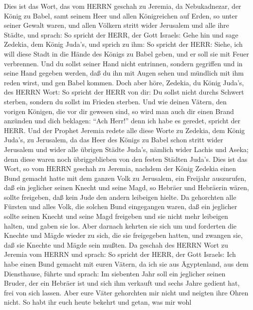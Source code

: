  Dies ist das Wort, das vom HERRN geschah zu Jeremia, da
Nebukadnezar, der König zu Babel, samt seinem Heer und allen
Königreichen auf Erden, so unter seiner Gewalt waren, und allen Völkern
stritt wider Jerusalem und alle ihre Städte, und sprach:  So
spricht der HERR, der Gott Israels: Gehe hin und sage Zedekia, dem König
Juda's, und sprich zu ihm: So spricht der HERR: Siehe, ich will diese
Stadt in die Hände des Königs zu Babel geben, und er soll sie mit Feuer
verbrennen.  Und du sollst seiner Hand nicht entrinnen,
sondern gegriffen und in seine Hand gegeben werden, daß du ihn mit Augen
sehen und mündlich mit ihm reden wirst, und gen Babel kommen.
 Doch aber höre, Zedekia, du König Juda's, des HERRN Wort:
So spricht der HERR von dir: Du sollst nicht durchs Schwert sterben,
 sondern du sollst im Frieden sterben. Und wie deinen
Vätern, den vorigen Königen, die vor dir gewesen sind, so wird man auch
dir einen Brand anzünden und dich beklagen: ``Ach Herr!'' denn ich habe
es geredet, spricht der HERR.  Und der Prophet Jeremia
redete alle diese Worte zu Zedekia, dem König Juda's, zu Jerusalem,
 da das Heer des Königs zu Babel schon stritt wider
Jerusalem und wider alle übrigen Städte Juda's, nämlich wider Lachis und
Aseka; denn diese waren noch übriggeblieben von den festen Städten
Juda's.  Dies ist das Wort, so vom HERRN geschah zu Jeremia,
nachdem der König Zedekia einen Bund gemacht hatte mit dem ganzen Volk
zu Jerusalem, ein Freijahr auszurufen,  daß ein jeglicher
seinen Knecht und seine Magd, so Hebräer und Hebräerin wären, sollte
freigeben, daß kein Jude den andern leibeigen hielte.  Da
gehorchten alle Fürsten und alles Volk, die solchen Bund eingegangen
waren, daß ein jeglicher sollte seinen Knecht und seine Magd freigeben
und sie nicht mehr leibeigen halten, und gaben sie los. 
Aber darnach kehrten sie sich um und forderten die Knechte und Mägde
wieder zu sich, die sie freigegeben hatten, und zwangen sie, daß sie
Knechte und Mägde sein mußten.  Da geschah des HERRN Wort
zu Jeremia vom HERRN und sprach:  So spricht der HERR, der
Gott Israels: Ich habe einen Bund gemacht mit euren Vätern, da ich sie
aus Ägyptenland, aus dem Diensthause, führte und sprach: 
Im siebenten Jahr soll ein jeglicher seinen Bruder, der ein Hebräer ist
und sich ihm verkauft und sechs Jahre gedient hat, frei von sich lassen.
Aber eure Väter gehorchten mir nicht und neigten ihre Ohren nicht.
 So habt ihr euch heute bekehrt und getan, was mir wohl
